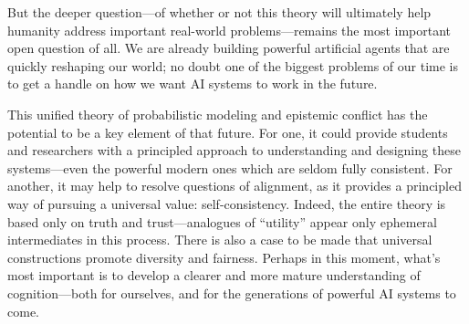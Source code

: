 %



But the deeper question---of whether or not this theory will ultimately help humanity address important real-world problems---remains the most important open question of all.
We are already building powerful artificial agents that are quickly reshaping our world; no doubt one of the biggest problems of our time is to get a handle on how we want AI systems to work in the future.  


This unified theory of probabilistic modeling and epistemic conflict has the potential to be a key element of that future.
For one, it could provide students and researchers with a principled approach to understanding and designing these systems---even the powerful modern ones which are seldom fully consistent. 
For another, it may help to resolve questions of alignment, as it provides a principled way of pursuing a universal value: self-consistency. 
Indeed, the entire theory is based only on truth and trust---analogues of ``utility'' appear only ephemeral intermediates in this process. 
There is also a case to be made that universal constructions promote diversity and fairness.
%
Perhaps in this moment, 
what's most important
is to develop a clearer and more mature understanding
    of cognition---both for ourselves,
    and for the generations of powerful AI systems to come.


